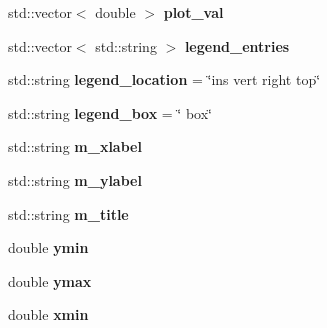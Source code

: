 \begin{DoxyCompactItemize}
\item 
\hypertarget{classkeycpp_1_1_plots_a95cfb5daf2425e227f5148c7c6a04e80}{std\-::vector$<$ double $>$ {\bfseries plot\-\_\-val}}\label{classkeycpp_1_1_plots_a95cfb5daf2425e227f5148c7c6a04e80}

\item 
\hypertarget{classkeycpp_1_1_plots_a25df6878ccfbbe680c5324e0fab789ac}{std\-::vector$<$ std\-::string $>$ {\bfseries legend\-\_\-entries}}\label{classkeycpp_1_1_plots_a25df6878ccfbbe680c5324e0fab789ac}

\item 
\hypertarget{classkeycpp_1_1_plots_add620558a2e9a243a95ffdfe7489897b}{std\-::string {\bfseries legend\-\_\-location} = \char`\"{}ins vert right top\char`\"{}}\label{classkeycpp_1_1_plots_add620558a2e9a243a95ffdfe7489897b}

\item 
\hypertarget{classkeycpp_1_1_plots_ab3c932242df0fa03798ecfd2dba3ebaa}{std\-::string {\bfseries legend\-\_\-box} = \char`\"{} box\char`\"{}}\label{classkeycpp_1_1_plots_ab3c932242df0fa03798ecfd2dba3ebaa}

\item 
\hypertarget{classkeycpp_1_1_plots_a18a69c533594b4bc1c88fdb29267db1e}{std\-::string {\bfseries m\-\_\-xlabel}}\label{classkeycpp_1_1_plots_a18a69c533594b4bc1c88fdb29267db1e}

\item 
\hypertarget{classkeycpp_1_1_plots_ad2987af367059a0659e013708342451b}{std\-::string {\bfseries m\-\_\-ylabel}}\label{classkeycpp_1_1_plots_ad2987af367059a0659e013708342451b}

\item 
\hypertarget{classkeycpp_1_1_plots_a849d297c44ebca4f7c856c99cfcc2b5f}{std\-::string {\bfseries m\-\_\-title}}\label{classkeycpp_1_1_plots_a849d297c44ebca4f7c856c99cfcc2b5f}

\item 
\hypertarget{classkeycpp_1_1_plots_a54578198c41d34705e9fbe94a88ec6ae}{double {\bfseries ymin}}\label{classkeycpp_1_1_plots_a54578198c41d34705e9fbe94a88ec6ae}

\item 
\hypertarget{classkeycpp_1_1_plots_ad411158572c6ee36b1f4abc9c9dfec77}{double {\bfseries ymax}}\label{classkeycpp_1_1_plots_ad411158572c6ee36b1f4abc9c9dfec77}

\item 
\hypertarget{classkeycpp_1_1_plots_a1d027ed119d5b4a8d7d9ccc72f9a0eb1}{double {\bfseries xmin}}\label{classkeycpp_1_1_plots_a1d027ed119d5b4a8d7d9ccc72f9a0eb1}


\end{DoxyCompactItemize}
